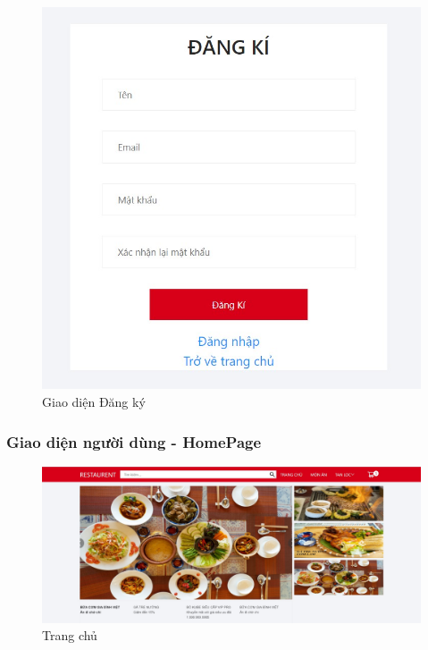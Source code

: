 \documentclass[a4paper]{article}
\begin{document}
\begin{figure}[!h]
    \begin{center}
        \includegraphics[scale=0.5]{Images/screen_flow/register.jpg}
    \end{center}
    \hspace{0.3cm}
    \caption{Giao diện Đăng ký}
\end{figure}

\subsubsection{Giao diện người dùng - HomePage}

\begin{figure}[!h]
    \begin{center}
        \includegraphics[scale=0.4]{Images/screen_flow/home-slider.jpg}
    \end{center}
    \hspace{0.3cm}
    \caption{Trang chủ}
\end{figure}
\end{document}
